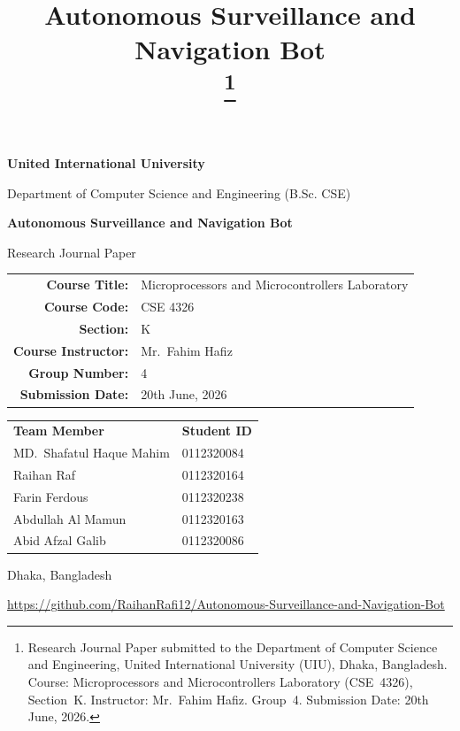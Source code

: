 \documentclass[conference]{IEEEtran}
\begin{document}
\begin{titlepage}
\centering
\vspace*{1.5cm}
{\LARGE\textbf{United International University}\par}
\vspace{0.4cm}
{\large Department of Computer Science and Engineering (B.Sc. CSE)\par}
\vspace{1.2cm}
{\Huge\textbf{Autonomous Surveillance and Navigation Bot}\par}
\vspace{0.6cm}
{\Large Research Journal Paper\par}
\vspace{1.0cm}
\begin{tabular}{rl}
\textbf{Course Title:} & Microprocessors and Microcontrollers Laboratory \\
\textbf{Course Code:} & CSE 4326 \\
\textbf{Section:} & K \\
\textbf{Course Instructor:} & Mr.~Fahim Hafiz \\
\textbf{Group Number:} & 4 \\
\textbf{Submission Date:} & 20th June, 2026 \\
\end{tabular}
\vspace{1.2cm}

\begin{tabular}{ll}
\textbf{Team Member} & \textbf{Student ID} \\
MD.~Shafatul Haque Mahim & 0112320084 \\
Raihan Raf & 0112320164 \\
Farin Ferdous & 0112320238 \\
Abdullah Al Mamun & 0112320163 \\
Abid Afzal Galib & 0112320086 \\
\end{tabular}

\vfill
{\large Dhaka, Bangladesh\par}
{\large \url{https://github.com/RaihanRafi12/Autonomous-Surveillance-and-Navigation-Bot}\par}
\end{titlepage}

\title{Autonomous Surveillance and Navigation Bot\\
\thanks{Research Journal Paper submitted to the Department of Computer Science and Engineering, United International University (UIU), Dhaka, Bangladesh. Course: Microprocessors and Microcontrollers Laboratory (CSE~4326), Section~K. Instructor: Mr.~Fahim Hafiz. Group~4. Submission Date: 20th June, 2026.}
}
\end{document}
